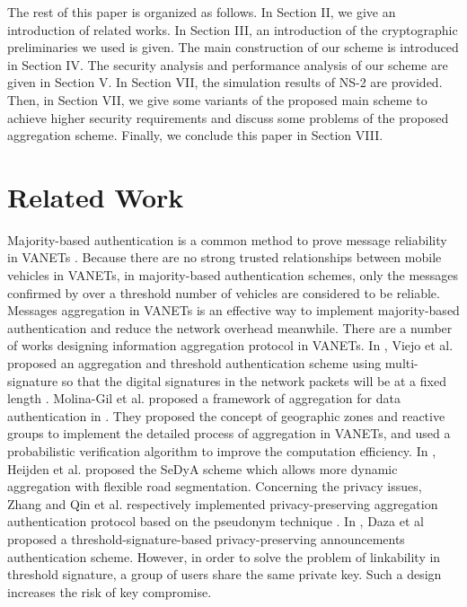 \documentclass[a4paper]{article}
\begin{document}
The rest of this paper is organized as follows. In Section II, we give an introduction of related works. In Section III, an introduction of the cryptographic preliminaries we used is given. The main construction of our scheme is introduced in Section IV. The security analysis and performance analysis of our scheme are given in Section V. In Section VII, the simulation results of NS-2 are provided. Then, in Section VII, we give some variants of the proposed main scheme to achieve higher security requirements and discuss some problems of the proposed aggregation scheme. Finally, we conclude this paper in Section VIII.

\section{Related Work}
Majority-based authentication is a common method to prove message reliability in VANETs \cite{CNW11}\cite{DDSV09}\cite{KWL09}\cite{VS09}. Because there are no strong trusted relationships between mobile vehicles in VANETs, in majority-based authentication schemes, only the messages confirmed by over a threshold number of vehicles are considered to be reliable. Messages aggregation in VANETs is an effective way to implement majority-based authentication and reduce the network overhead meanwhile. There are a number of works designing information aggregation protocol in VANETs. In \cite{VS09}, Viejo et al. proposed an aggregation and threshold authentication scheme using multi-signature so that the digital signatures in the network packets will be at a fixed length . Molina-Gil et al. proposed a framework of aggregation for data authentication in \cite{MCC14}. They proposed the concept of geographic zones and reactive groups to implement the detailed process of aggregation in VANETs, and used a probabilistic verification algorithm to improve the computation efficiency. In \cite{HDK13}, Heijden et al. proposed the SeDyA scheme which allows more dynamic aggregation with flexible road segmentation. Concerning the privacy issues, Zhang and Qin et al. respectively implemented privacy-preserving aggregation authentication protocol based on the pseudonym technique \cite{ZWQ11}\cite{QWD12}. In \cite{DDSV09}, Daza et al proposed a threshold-signature-based privacy-preserving announcements authentication scheme. However, in order to solve the problem of linkability in threshold signature, a group of users share the same private key. Such a design increases the risk of key compromise.
\end{document}
